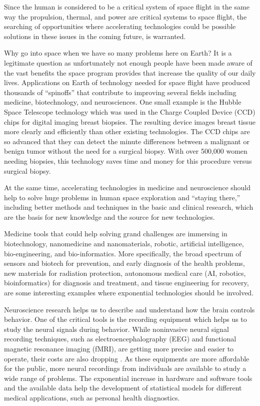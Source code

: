 \documentclass[letter,11pt]{article}
\begin{document}
Since the human is considered to be a critical system of space flight in the
same way the propulsion, thermal, and power are critical systems to space
flight, the searching of opportunities where accelerating technologies could be
possible solutions in these issues in the coming future, is warranted.
 
Why go into space when we have so many problems here on Earth? It is a
legitimate question as unfortunately not enough people have been made aware of
the vast benefits the space program provides that increase the quality of our
daily lives. Applications on Earth of technology needed for space flight have
produced thousands of ``spinoffs'' that contribute to improving several fields
including medicine, biotechnology, and neurosciences\cite{TheSpacePlace2004}.
One small example is the Hubble Space Telescope technology which was used in
the Charge Coupled Device (CCD) chips for digital imaging breast biopsies. The
resulting device images breast tissue more clearly and efficiently than other
existing technologies. The CCD chips are so advanced that they can detect the
minute differences between a malignant or benign tumor without the need for a
surgical biopsy. With over 500,000 women needing biopsies, this technology saves
time and money for this procedure versus surgical biopsy. 
 
At the same time, accelerating technologies in medicine and neuroscience should
help to solve huge problems in human space exploration and ``staying there,''
including better methods and techniques in the basic and clinical research,
which are the basis for new knowledge and the source for new technologies. 
 
Medicine tools that could help solving grand challenges are immersing in
biotechnology, nanomedicine and nanomaterials, robotic, artificial
intelligence, bio-engineering, and bio-informatics. More specifically, the
broad spectrum of sensors and biotech for prevention, and early diagnosis of
the health problems, new materials for radiation protection, autonomous medical
care (AI, robotics, bioinformatics) for diagnosis and treatment, and tissue
engineering for recovery, are some interesting examples where exponential
technologies should be involved.
 
Neuroscience research helps us to describe and understand how the brain
controls behavior. One of the critical tools is the recording equipment which
helps us to study the neural signals during behavior. While noninvasive neural
signal recording techniques, such as electroencephalography (EEG) and
functional magnetic resonance imaging (fMRI), are getting more precise and
easier to operate, their costs are also dropping \cite{mri1991}. As these
equipments are more affordable for the public, more neural recordings from
individuals are available to study a wide range of problems. The exponential
increase in hardware and software tools and the available data help the
development of statistical models for different medical applications, such as
personal health diagnostics.
 
\end{document}
